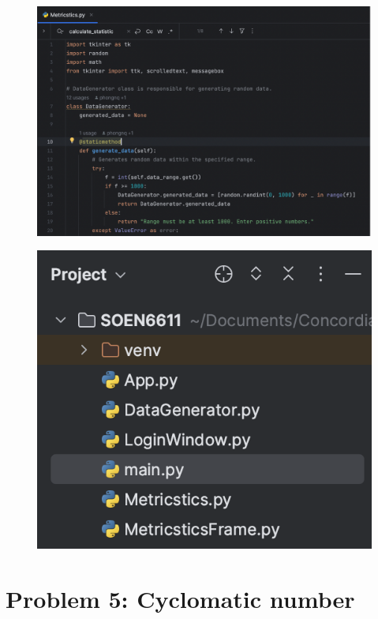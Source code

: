 {{{\label{sec: Figure 11}
\begin{figure}[htp]
    \centering
    \includegraphics[width=15cm]{p11.png}
    \label{fig:Figure 11}
\end{figure}

\pagebreak

\label{sec: Figure 12}
\begin{figure}[htp]
    \centering
    \includegraphics[width=12cm, height=10cm]{p12.png}
    \label{fig:Figure 12}
\end{figure}

\pagebreak


\section{Problem 5: Cyclomatic number}

}}}
